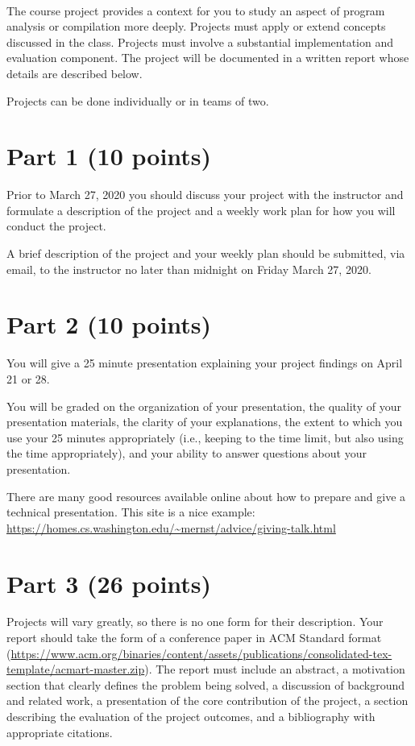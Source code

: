 \documentclass[12pt,letterpaper]{article}
\begin{document}
~

The course project provides a context for you to study
an aspect of program analysis or compilation more deeply.
Projects must apply or extend concepts discussed in the class.
Projects must involve a substantial implementation and evaluation
component.  The project will be documented in a written
report whose details are described below. 

Projects can be done individually or in teams of two.

\section*{Part 1 (10 points)}
Prior to March 27, 2020 you should discuss your
project with the instructor
and formulate a description of the project
and a weekly work plan for how you will conduct the project.

A brief description of the project and your weekly plan should
be submitted, via email, to the instructor no later than
midnight on Friday March 27, 2020.

\section*{Part 2 (10 points)}
You will give a 25 minute presentation explaining your project findings
on April 21 or 28.  

You will be graded on the organization of your presentation,
the quality of your presentation materials,
the clarity of your explanations,
the extent to which you use your 25 minutes appropriately (i.e., keeping
to the time limit, but also using the time appropriately),
and your ability to answer questions about your presentation.

There are many good resources available online about how to prepare
and give a technical presentation.  This site is a nice example:
\url{https://homes.cs.washington.edu/~mernst/advice/giving-talk.html}

\section*{Part 3 (26 points)}
Projects will vary greatly, so there is no one form for their
description.  Your report should take the form of a 
conference paper in ACM Standard format (\url{https://www.acm.org/binaries/content/assets/publications/consolidated-tex-template/acmart-master.zip}). The report must include an abstract, a motivation 
section that clearly defines the problem being solved,
a discussion of background and related work, a presentation
of the core contribution of the project, a section describing
the evaluation of the project outcomes, and a bibliography
with appropriate citations.
\end{document}

